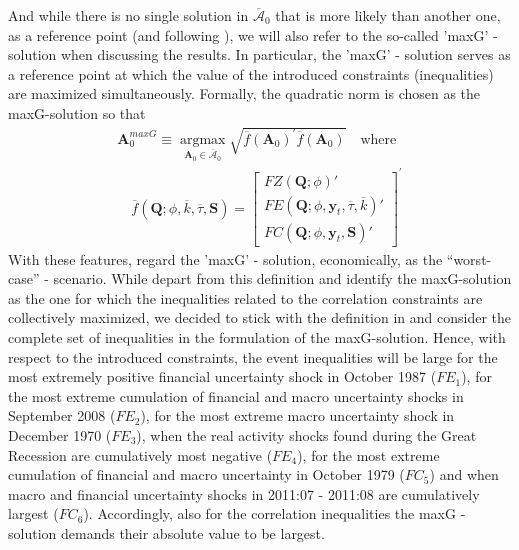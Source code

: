 \documentclass[a4paper,11pt,listof=nochaptergap,oneside,pointednumbers,bibtotoc,bigheadings,liststotoc,hidelinks]{scrbook}
\theoremstyle{mysatz}
\theoremstyle{mydefinition}
\theoremstyle{mytheorem}
\theoremstyle{mybemerkung}
\newcommand{\vect}[1]{\boldsymbol{\mathbf{#1}}}
\begin{document}
And while there is no single solution in $\overline{\vect{\mathcal{A}}}_0$ that is more likely than another one, as a reference point (and following \citealp{ludvigsonetal:18}), we will also refer to the so-called 'maxG' - solution when discussing the results. In particular, the 'maxG' - solution serves as a reference point at which the value of the introduced constraints (inequalities) are maximized simultaneously. Formally, the quadratic norm is chosen as the maxG-solution so that
\begin{equation} \label{eq:svar_ludvi16}
\begin{split}
\vect{A}_0^{maxG} \equiv \operatorname*{argmax}_{\vect{A}_0 \in \overline{\vect{\mathcal{A}}}_0} \sqrt{\overline{f}(\vect{A}_0)^'\overline{f}(\vect{A}_0)} \quad \text{where} \\
\quad \overline{f}(\vect{Q}; \phi, \overline{k}, \overline{\tau}, \vect{S}) = \begin{bmatrix}
			FZ(\vect{Q}; \phi)' \\
			FE(\vect{Q}; \phi, \vect{y}_t, \overline{\tau}, \overline{k})' \\
			FC(\vect{Q}; \phi, \vect{y}_t, \vect{S})'
		\end{bmatrix}^'
\end{split}								
\end{equation}
With these features, \citet{ludvigsonetal:18} regard the 'maxG' - solution, economically, as the ``worst-case'' - scenario. While \citet{ludvigsonetal:19} depart from this definition and identify the maxG-solution as the one for which the inequalities related to the correlation constraints are collectively maximized, we decided to stick with the definition in \citet{ludvigsonetal:18} and consider the complete set of inequalities in the formulation of the maxG-solution. Hence, with respect to the introduced constraints, the event inequalities will be large for the most extremely positive financial uncertainty shock in October 1987 ($FE_1$), for the most extreme cumulation of financial and macro uncertainty shocks in September 2008 ($FE_2$), for the most extreme macro uncertainty shock in December 1970 ($FE_3$), when the real activity shocks found during the Great Recession are cumulatively most negative ($FE_4$), for the most extreme cumulation of financial and macro uncertainty in October 1979 ($FC_5$) and when macro and financial uncertainty shocks in 2011:07 - 2011:08 are cumulatively largest ($FC_6$). Accordingly, also for the correlation inequalities the maxG -solution demands their absolute value to be largest.
\end{document}
